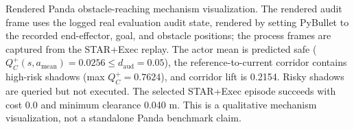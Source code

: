 Rendered Panda obstacle-reaching mechanism visualization. The rendered audit frame uses the logged real evaluation audit state, rendered by setting PyBullet to the recorded end-effector, goal, and obstacle positions; the process frames are captured from the STAR+Exec replay. The actor mean is predicted safe ($Q_C^+(s,a_\mathrm{mean})=0.0256\le d_\mathrm{aud}=0.05$), the reference-to-current corridor contains high-risk shadows (max $Q_C^+=0.7624$), and corridor lift is 0.2154. Risky shadows are queried but not executed. The selected STAR+Exec episode succeeds with cost 0.0 and minimum clearance 0.040 m. This is a qualitative mechanism visualization, not a standalone Panda benchmark claim.
